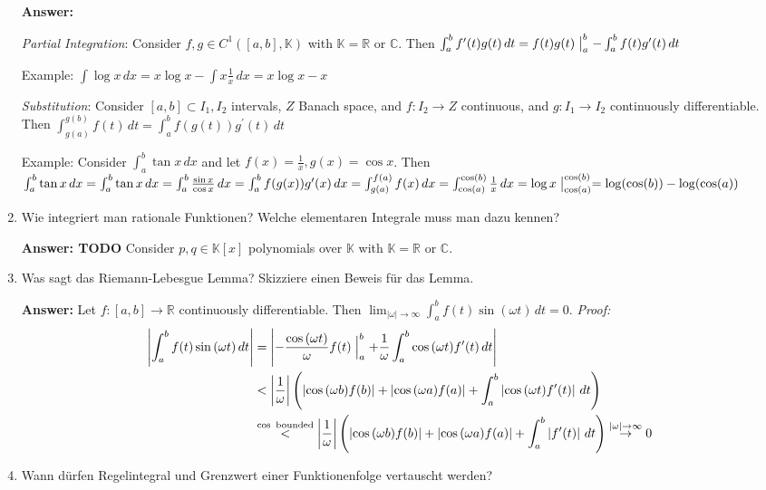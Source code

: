 \documentclass[11pt]{article}
\newcommand{\abs}[1]{\left|#1\right|}
\newcommand{\RR}[0]{\mathbb{R}}
\newcommand{\CC}[0]{\mathbb{C}}
\newcommand{\KK}[0]{\mathbb{K}}
\begin{document}
\begin{enumerate}
    \textbf{Answer:}

    \textit{Partial Integration}: Consider $f, g \in C^1([a, b], \KK)$ with $\KK = \RR$ or $\CC$. Then $\int_a^b f^\prime(t) g(t)\,dt = f(t) g(t)\bigm|_a^b - \int_a^b f(t) g^\prime(t)\,dt$

    Example: $\int \log{x} \,dx = x \log{x} - \int x \frac{1}{x} \,dx = x \log{x} - x$

    \textit{Substitution}: Consider $[a, b] \subset I_1, I_2$ intervals, $Z$ Banach space, and $f: I_2 \to Z$ continuous, and $g\colon I_1 \to I_2$ continuously differentiable. Then $\int_{g(a)}^{g(b)} f(t)\,dt = \int_a^b f(g(t)) g^\prime(t) \,dt$

    Example: Consider $\int_a^b \tan{x} \,dx$ and let $f(x) = \frac{1}{x}, g(x) = \cos{x}$. Then $\int_a^b \tan{x} \,dx = \int_a^b \tan{x}\,dx = \int_a^b \frac{\sin{x}}{\cos{x}}\,dx = \int_a^b f(g(x)) g^\prime(x) \,dx = \int_{g(a)}^{f(a)} f(x) \,dx = \int_{\cos(a)}^{\cos(b)} \frac{1}{x}\,dx = \log{x}\bigm|_{\cos(a)}^{\cos(b)} = \log(\cos(b)) - \log(\cos(a))$

    \item Wie integriert man rationale Funktionen? Welche elementaren Integrale muss man dazu kennen?

    \textbf{Answer: TODO} Consider $p, q \in \KK\left[x\right]$ polynomials over $\KK$ with $\KK = \RR$ or $\CC$.

    \item Was sagt das Riemann-Lebesgue Lemma? Skizziere einen Beweis für das Lemma.

    \textbf{Answer:} Let $f\colon [a, b] \to \RR$ continuously differentiable. Then $\lim_{\abs{\omega}\to\infty} \int_a^b f(t) \sin(\omega t) \,dt = 0$.
    \textit{Proof:} $$\begin{aligned}
        \abs{\int_a^b f(t) \sin{(\omega t)}\,dt} &= \abs{-\frac{\cos{(\omega t)}}{\omega}f(t)\Bigm|_a^b + \frac{1}{\omega} \int_a^b \cos{(\omega t)} f^\prime(t)\,dt} \\
        &< \abs{\frac{1}{\omega}} \left(\abs{\cos{(\omega b)} f(b)} + \abs{\cos{(\omega a)} f(a)} + \int_a^b \abs{\cos{(\omega t)} f^\prime(t)}\,dt \right)\\
        &\stackrel{\cos\text{ bounded}}{<} \abs{\frac{1}{\omega}} \left(\abs{\cos{(\omega b)} f(b)} + \abs{\cos{(\omega a)} f(a)} + \int_a^b \abs{f^\prime(t)}\,dt \right) \stackrel{\abs{\omega} \to \infty}{\to} 0
    \end{aligned}$$
    \item Wann dürfen Regelintegral und Grenzwert einer Funktionenfolge vertauscht werden?


\end{enumerate}
\end{document}
